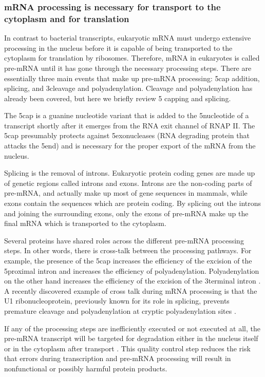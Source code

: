\subsubsection{mRNA processing is necessary for transport to the cytoplasm and
for translation}
In contrast to bacterial transcripts, eukaryotic mRNA must undergo extensive
processing in the nucleus before it is capable of being transported to the
cytoplasm for translation by ribosomes. Therefore, mRNA in eukaryotes is called
pre-mRNA until it has gone through the necessary processing steps. There are
essentially three main events that make up pre-mRNA processing: 5\p cap
addition, splicing, and 3\p cleavage and polyadenylation. Cleavage and
polyadenylation has already been covered, but here we briefly review 5\p
capping and splicing.

The 5\p cap is a guanine nucleotide variant that is added to the 5\p nucleotide
of a transcript shortly after it emerges from the RNA exit channel of RNAP II.
The 5\p cap presumably protects against 5\p exonucleases (RNA degrading protein
that attacks the 5\p end) and is necessary for the proper export of the mRNA
from the nucleus.

Splicing is the removal of introns. Eukaryotic protein coding genes are made up
of genetic regions called introns and exons. Introns are the non-coding parts
of pre-mRNA, and actually make up most of gene sequences in mammals, while
exons contain the sequences which are protein coding. By splicing out the
introns and joining the surrounding exons, only the exons of pre-mRNA make up
the final mRNA which is transported to the cytoplasm.

Several proteins have shared roles across the different pre-mRNA processing
steps. In other words, there is cross-talk between the processing pathways. For
example, the presence of the 5\p cap increases the efficiency of the excision
of the 5\p proximal intron and increases the efficiency of polyadenylation.
Polyadenylation on the other hand increases the efficiency of the excision of
the 3\p terminal intron \cite{proudfoot_integrating_2002}. A recently
discovered example of cross talk during mRNA processing is that the U1
ribonucleoprotein, previously known for its role in splicing, prevents
premature cleavage and polyadenylation at cryptic polyadenylation sites
\cite{kaida_u1_2010}.

If any of the processing steps are inefficiently executed or not executed at
all, the pre-mRNA transcript will be targeted for degradation either in the
nucleus itself or in the cytoplasm after transport \cite{doma_rna_2007}. This
quality control step reduces the risk that errors during transcription and
pre-mRNA processing will result in nonfunctional or possibly harmful protein
products.

